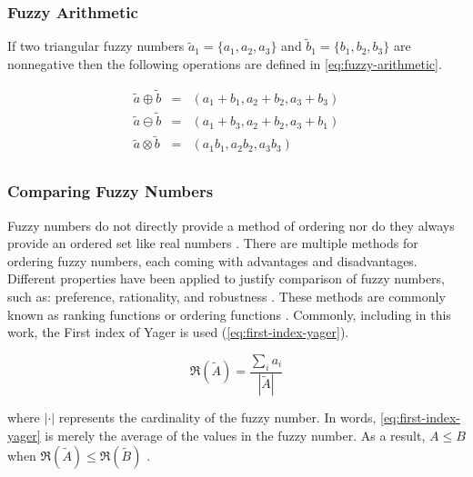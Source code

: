\documentclass[ee,msthesis]{usuthesis}
\begin{document}
\subsubsection{Fuzzy Arithmetic}
\label{sec:org916213b}
If two triangular fuzzy numbers \(\tilde{a}_1 = \{a_1, a_2, a_3\}\) and \(\tilde{b}_1 = \{b_1, b_2, b_3\}\) are nonnegative
then the following operations are defined in \ref{eq:fuzzy-arithmetic}.

\begin{equation}
\label{eq:fuzzy-arithmetic}
\begin{array}{lcl}
\tilde{a} \oplus \tilde{b} & = & (a_1 + b_1, a_2 + b_2, a_3 + b_3) \\
\tilde{a} \ominus \tilde{b} & = & (a_1 + b_3, a_2 + b_2, a_3 + b_1) \\
\tilde{a} \otimes \tilde{b} & = & (a_1 b_1, a_2 b_2, a_3 b_3)       \\
\end{array}
\end{equation}

\subsubsection{Comparing Fuzzy Numbers}
\label{sec:orga6ee5e0}
Fuzzy numbers do not directly provide a method of ordering nor do they always provide an ordered set like real numbers
\cite{bello-2019-fuzzy-activ}. There are multiple methods for ordering fuzzy numbers, each coming with advantages and
disadvantages. Different properties have been applied to justify comparison of fuzzy numbers, such as: preference,
rationality, and robustness \cite{jimenez-2007-linear-progr,bello-2019-fuzzy-activ,kaur-2016-introd-fuzzy}. These
methods are commonly known as ranking functions or ordering functions
\cite{bello-2019-fuzzy-activ,das-2016-mathem-model,kaur-2016-introd-fuzzy}. Commonly, including in this work, the First
index of Yager \cite{yager-1981-proced-order} is used (\ref{eq:first-index-yager}).

\begin{equation}
\label{eq:first-index-yager}
\mathfrak{R}(\tilde{A}) = \frac{\sum_i a_i}{|\tilde{A}|}
\end{equation}

\noindent where \(|\cdot|\) represents the cardinality of the fuzzy number. In words, \ref{eq:first-index-yager} is merely the
average of the values in the fuzzy number. As a result, \(A \le B\) when \(\mathfrak{R}(\tilde{A}) \le \mathfrak{R}(\tilde{B})\)
\cite{bello-2019-fuzzy-activ}.
\end{document}
